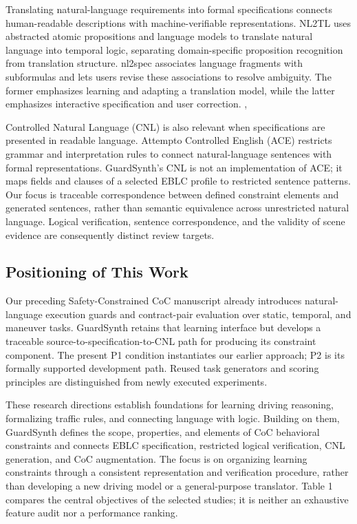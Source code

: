 \documentclass[nolineno]{ieeeaccess}
\begin{document}
Translating natural-language requirements into formal specifications connects human-readable descriptions with machine-verifiable representations. NL2TL uses abstracted atomic propositions and language models to translate natural language into temporal logic, separating domain-specific proposition recognition from translation structure. nl2spec associates language fragments with subformulas and lets users revise these associations to resolve ambiguity. The former emphasizes learning and adapting a translation model, while the latter emphasizes interactive specification and user correction. \cite{r8}, \cite{r9}\par

Controlled Natural Language (CNL) is also relevant when specifications are presented in readable language. Attempto Controlled English (ACE) restricts grammar and interpretation rules to connect natural-language sentences with formal representations. GuardSynth's CNL is not an implementation of ACE; it maps fields and clauses of a selected EBLC profile to restricted sentence patterns. Our focus is traceable correspondence between defined constraint elements and generated sentences, rather than semantic equivalence across unrestricted natural language. Logical verification, sentence correspondence, and the validity of scene evidence are consequently distinct review targets. \cite{r10}\par

\subsection{Positioning of This Work}

Our preceding Safety-Constrained CoC manuscript already introduces natural-language execution guards and contract-pair evaluation over static, temporal, and maneuver tasks. GuardSynth retains that learning interface but develops a traceable source-to-specification-to-CNL path for producing its constraint component. The present P1 condition instantiates our earlier approach; P2 is its formally supported development path. Reused task generators and scoring principles are distinguished from newly executed experiments. \cite{r4}\par

These research directions establish foundations for learning driving reasoning, formalizing traffic rules, and connecting language with logic. Building on them, GuardSynth defines the scope, properties, and elements of CoC behavioral constraints and connects EBLC specification, restricted logical verification, CNL generation, and CoC augmentation. The focus is on organizing learning constraints through a consistent representation and verification procedure, rather than developing a new driving model or a general-purpose translator. Table 1 compares the central objectives of the selected studies; it is neither an exhaustive feature audit nor a performance ranking.\par
\end{document}
